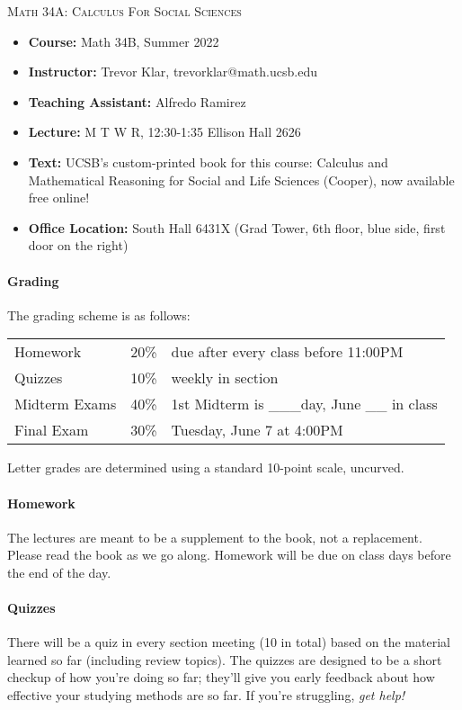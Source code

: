 \documentclass[a4paper,12pt]{article}
\begin{document}
\begin{center} {\Large \scshape Math 34A: Calculus For Social Sciences}
\end{center}

\vspace{0.75cm}

\begin{itemize}
\item {\bf Course:} Math 34B, Summer 2022
\item {\bf Instructor:} Trevor Klar,  trevorklar@math.ucsb.edu
\item {\bf Teaching Assistant:} Alfredo Ramirez
\item {\bf Lecture:} M T W R, 12:30-1:35 Ellison Hall 2626
\item {\bf Text:} UCSB's custom-printed book for this course: Calculus and Mathematical Reasoning for Social and Life Sciences (Cooper), now available free online!
\item {\bf Office Location:} South Hall 6431X (Grad Tower, 6th floor, blue side, first door on the right)
\end{itemize}

\paragraph{Grading}
The grading scheme is as follows:
\begin{center}
\begin{tabular}{lll}
Homework       & 20\% & due after every class before 11:00PM \\
Quizzes        & 10\% & weekly in section  \\ 
Midterm Exams & 40\% & 1st Midterm is \_\_\_day, June \_\_ in class \\
Final Exam  & 30\% & Tuesday, June 7 at 4:00PM
\end{tabular}
\end{center}
Letter grades are determined using a standard 10-point scale, uncurved.

\paragraph{Homework}
 The lectures are meant to be a supplement to the book, not a replacement. Please read the book as we go along. Homework will be due on class days before the end of the day. 
 
 \paragraph{Quizzes} 
 There will be a quiz in every section meeting (10 in total) based on the material learned so far (including review topics). The quizzes are designed to be a short checkup of how you're doing so far; they'll give you early feedback about how effective your studying methods are so far. If you're struggling, \textit{get help!}
 
\end{document}
